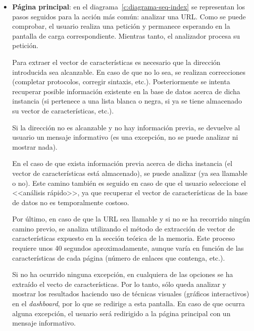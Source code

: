\begin{itemize}
	\item \textbf{Página principal}: en el diagrama~\ref{c:diagrama-seq-index} se representan los pasos seguidos para la acción más común: analizar una URL. Como se puede comprobar, el usuario realiza una petición y permanece esperando en la pantalla de carga correspondiente. Mientras tanto, el analizador procesa su petición.
	
	Para extraer el vector de características es necesario que la dirección introducida sea alcanzable. En caso de que no lo sea, se realizan correcciones (completar protocolos, corregir sintaxis, etc.). Posteriormente se intenta recuperar posible información existente en la base de datos acerca de dicha instancia (si pertenece a una lista blanca o negra, si ya se tiene almacenado su vector de características, etc.).
	
	Si la dirección no es alcanzable y no hay información previa, se devuelve al usuario un mensaje informativo (es una excepción, no se puede analizar ni mostrar nada).
	
	En el caso de que exista información previa acerca de dicha instancia (el vector de características está almacenado), se puede analizar (ya sea llamable o no). Este camino también es seguido en caso de que el usuario seleccione el <<análisis rápido>>, ya que recuperar el vector de características de la base de datos no es temporalmente costoso.
	
	Por último, en caso de que la URL sea llamable y si no se ha recorrido ningún camino previo, se analiza utilizando el método de extracción de vector de características expuesto en la sección teórica de la memoria. Este proceso requiere unos 40 segundos aproximadamente, aunque varía en función de las características de cada página (número de enlaces que contenga, etc.).
	
	Si no ha ocurrido ninguna excepción, en cualquiera de las opciones se ha extraído el vecto de características. Por lo tanto, sólo queda analizar y mostrar los resultados haciendo uso de técnicas visuales (gráficos interactivos) en el \textit{dashboard}, por lo que se redirige a esta pantalla. En caso de que ocurra alguna excepción, el usuario será redirigido a la página principal con un mensaje informativo.
	

\end{itemize}
